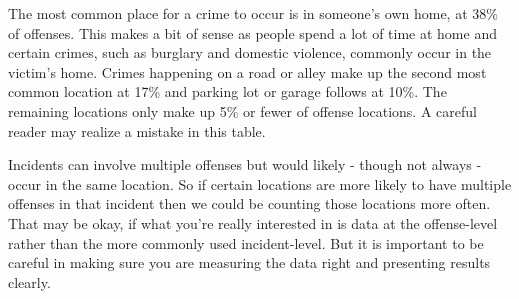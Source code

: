 \documentclass[
]{krantz}
\begin{document}
The most common place for a crime to occur is in someone's
own home, at 38\% of offenses. This makes a bit of sense as
people spend a lot of time at home and certain crimes, such
as burglary and domestic violence, commonly occur in the
victim's home. Crimes happening on a road or alley make up
the second most common location at 17\% and parking lot or
garage follows at 10\%. The remaining locations only make up
5\% or fewer of offense locations. A careful reader may
realize a mistake in this table.

Incidents can involve multiple offenses but would likely -
though not always - occur in the same location. So if
certain locations are more likely to have multiple offenses
in that incident then we could be counting those locations
more often. That may be okay, if what you're really
interested in is data at the offense-level rather than the
more commonly used incident-level. But it is important to be
careful in making sure you are measuring the data right and
presenting results clearly.
\end{document}
